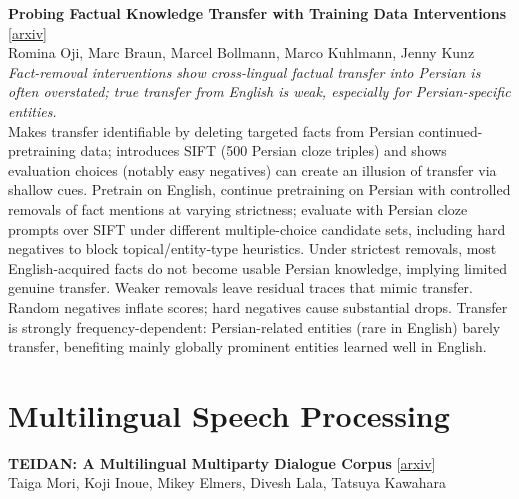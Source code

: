 \documentclass[12pt,letterpaper]{article}
\begin{document}
\medskip

{\small\textbf{Probing Factual Knowledge Transfer with Training Data Interventions}} {\scriptsize[\href{https://arxiv.org/abs/2609.01341}{arxiv}]}\\
{\scriptsize Romina Oji, Marc Braun, Marcel Bollmann, Marco Kuhlmann, Jenny Kunz}\\

{\small\textit{Fact-removal interventions show cross-lingual factual transfer into Persian is often overstated; true transfer from English is weak, especially for Persian-specific entities.}}\\[1pt]
{\footnotesize Makes transfer identifiable by deleting targeted facts from Persian continued-pretraining data; introduces SIFT (500 Persian cloze triples) and shows evaluation choices (notably easy negatives) can create an illusion of transfer via shallow cues. Pretrain on English, continue pretraining on Persian with controlled removals of fact mentions at varying strictness; evaluate with Persian cloze prompts over SIFT under different multiple-choice candidate sets, including hard negatives to block topical/entity-type heuristics. Under strictest removals, most English-acquired facts do not become usable Persian knowledge, implying limited genuine transfer. Weaker removals leave residual traces that mimic transfer. Random negatives inflate scores; hard negatives cause substantial drops. Transfer is strongly frequency-dependent: Persian-related entities (rare in English) barely transfer, benefiting mainly globally prominent entities learned well in English.}

\medskip


\section*{Multilingual Speech Processing}

{\small\textbf{TEIDAN: A Multilingual Multiparty Dialogue Corpus}} {\scriptsize[\href{https://arxiv.org/abs/2609.00802}{arxiv}]}\\
{\scriptsize Taiga Mori, Koji Inoue, Mikey Elmers, Divesh Lala, Tatsuya Kawahara}\\
\end{document}
